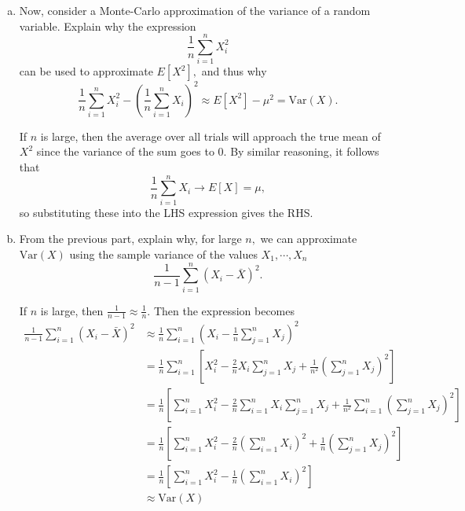 \documentclass{article}
\newcommand{\var}{\mathrm{Var}}
\begin{document}
\begin{enumerate}
\begin{enumerate}[(a)]
\begin{soln}
				\end{soln}
				
			\item Now, consider a Monte-Carlo approximation of the variance of a random variable. Explain why the expression \[\frac{1}{n}\sum_{i=1}^n X_i^2\] can be used to approximate $E[X^2],$ and thus why \[\frac{1}{n}\sum_{i=1}^n X_i^2 - \left( \frac{1}{n}\sum_{i=1}^n X_i \right)^2 \approx E[X^2]-\mu^2=\var(X).\]
				\begin{soln}
					If $n$ is large, then the average over all trials will approach the true mean of $X^2$ since the variance of the sum goes to 0. By similar reasoning, it follows that \[\frac{1}{n}\sum_{i=1}^{n}X_i\to E[X]=\mu, \] so substituting these into the LHS expression gives the RHS.

				\end{soln}

			\item From the previous part, explain why, for large $n,$ we can approximate $\var(X)$ using the sample variance of the values $X_1, \cdots, X_n$ \[\frac{1}{n-1}\sum_{i=1}^n (X_i-\bar{X})^2.\]
				\begin{soln}
				If $n$ is large, then $\frac{1}{n-1}\approx \frac{1}{n}.$ Then the expression becomes 
				\begin{align*}
					\frac{1}{n-1}\sum_{i=1}^{n}(X_i-\bar{X})^2 &\approx \frac{1}{n}\sum_{i=1}^{n}\left( X_i-\frac{1}{n}\sum_{j=1}^{n}X_j \right)^2 \\
					&= \frac{1}{n} \sum_{i=1}^{n}\left[ X_i^2 - \frac{2}{n}X_i\sum_{j=1}^{n} X_j + \frac{1}{n^2}\left(\sum_{j=1}^{n}X_j\right)^2 \right] \\
					&= \frac{1}{n}\left[ \sum_{i=1}^{n} X_i^2 - \frac{2}{n}\sum_{i=1}^{n}X_i\sum_{j=1}^{n} X_j + \frac{1}{n^2}\sum_{i=1}^{n}\left( \sum_{j=1}^{n} X_j \right)^2 \right] \\
					&= \frac{1}{n}\left[ \sum_{i=1}^{n}X_i^2 - \frac{2}{n}\left( \sum_{i=1}^{n} X_i \right)^2 + \frac{1}{n}\left( \sum_{j=1}^{n} X_j \right)^2  \right] \\
					&= \frac{1}{n} \left[ \sum_{i=1}^{n} X_i^2 - \frac{1}{n}\left(\sum_{i=1}^{n} X_i\right)^2\right] \\
					&\approx \var(X)
				\end{align*}
				
				\end{soln}


\end{enumerate}
\end{enumerate}
\end{document}
